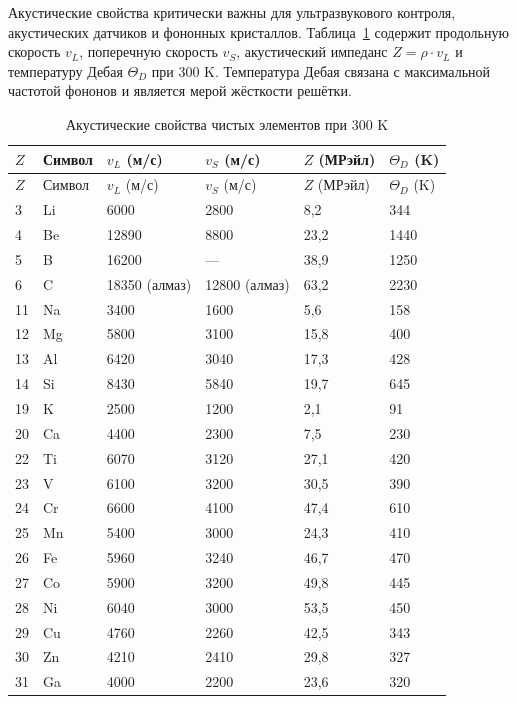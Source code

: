 \documentclass[12pt,a4paper]{article}
\begin{document}
	Акустические свойства критически важны для ультразвукового контроля, акустических датчиков и фононных кристаллов. Таблица~\ref{tab:acoustic-properties-func} содержит продольную скорость \(v_L\), поперечную скорость \(v_S\), акустический импеданс \(Z = \rho \cdot v_L\) и температуру Дебая \(\Theta_D\) при 300 K. Температура Дебая связана с максимальной частотой фононов и является мерой жёсткости решётки.
	
	\begin{longtable}{p{0.8cm}p{1.2cm}p{2.2cm}p{2.2cm}p{2.2cm}p{2.2cm}}
		\caption{Акустические свойства чистых элементов при 300 K} \label{tab:acoustic-properties-func} \\
		\toprule
		\(Z\) & Символ & \(v_L\) (м/с) & \(v_S\) (м/с) & \(Z\) (МРэйл) & \(\Theta_D\) (K) \\
		\midrule
		\endfirsthead
		\toprule
		\(Z\) & Символ & \(v_L\) (м/с) & \(v_S\) (м/с) & \(Z\) (МРэйл) & \(\Theta_D\) (K) \\
		\midrule
		\endhead
		3  & Li & 6000 & 2800 & 8,2 & 344 \\
		4  & Be & 12890 & 8800 & 23,2 & 1440 \\
		5  & B  & 16200 & --- & 38,9 & 1250 \\
		6  & C  & 18350 (алмаз) & 12800 (алмаз) & 63,2 & 2230 \\
		11 & Na & 3400 & 1600 & 5,6 & 158 \\
		12 & Mg & 5800 & 3100 & 15,8 & 400 \\
		13 & Al & 6420 & 3040 & 17,3 & 428 \\
		14 & Si & 8430 & 5840 & 19,7 & 645 \\
		19 & K  & 2500 & 1200 & 2,1 & 91 \\
		20 & Ca & 4400 & 2300 & 7,5 & 230 \\
		22 & Ti & 6070 & 3120 & 27,1 & 420 \\
		23 & V  & 6100 & 3200 & 30,5 & 390 \\
		24 & Cr & 6600 & 4100 & 47,4 & 610 \\
		25 & Mn & 5400 & 3000 & 24,3 & 410 \\
		26 & Fe & 5960 & 3240 & 46,7 & 470 \\
		27 & Co & 5900 & 3200 & 49,8 & 445 \\
		28 & Ni & 6040 & 3000 & 53,5 & 450 \\
		29 & Cu & 4760 & 2260 & 42,5 & 343 \\
		30 & Zn & 4210 & 2410 & 29,8 & 327 \\
		31 & Ga & 4000 & 2200 & 23,6 & 320 \\

\end{longtable}
\end{document}
